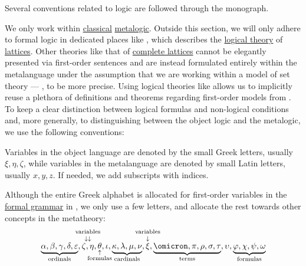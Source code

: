 \begin{remark}\label{rem:mathematical_logic_conventions}
  Several conventions related to logic are followed through the monograph.

  We only work within \hyperref[def:classical_logic]{classical} \hyperref[con:metalogic]{metalogic}. Outside this section, we will only adhere to formal logic in dedicated places like , which describes the \hyperref[def:logical_theory]{logical theory} of \hyperref[def:lattice]{lattices}. Other theories like that of \hyperref[def:complete_lattice]{complete lattices} cannot be elegantly presented via first-order sentences and are instead formulated entirely within the metalanguage under the assumption that we are working within a model of set theory --- \hyperref[def:axiom_of_universes]{}, to be more precise. Using logical theories like  allows us to implicitly reuse a plethora of definitions and theorems regarding first-order models from . To keep a clear distinction between logical formulas and non-logical conditions and, more generally, to distinguishing between the object logic and the metalogic, we use the following conventions:

  \begin{thmenum}
     Variables in the object language are denoted by the small Greek letters, usually \( \xi, \eta, \zeta \), while variables in the metalanguage are denoted by small Latin letters, usually \( x, y, z \). If needed, we add subscripts with indices.

     Although the entire Greek alphabet is allocated for first-order variables in the \hyperref[def:formal_grammar]{formal grammar} in , we only use a few letters, and allocate the rest towards other concepts in the metatheory:
    \begin{equation*}
      \underbrace{\alpha, \beta, \gamma, \delta, \varepsilon}_{\T{ordinals}},
      \overset{ \mathclap{ \substack{ \T{variables} \mathstrut \\ \mathstrut \downarrow \downarrow } } }{\zeta, \eta},
      \underset{ \mathclap{ \substack{ \uparrow \\ \T{formulas} } } }{\theta},
      \iota,
      \underbrace{\kappa, \lambda, \mu, \nu}_{\T{cardinals}},
      \overset{ \mathclap{ \substack{ \T{variables} \mathstrut \\ \mathstrut \downarrow } } }{\xi},
      \underbrace{\omicron, \pi, \rho, \sigma, \tau}_{\T{terms}},
      \upsilon,
      \underbrace{\varphi, \chi, \psi, \omega}_{\T{formulas}}
    \end{equation*}


\end{thmenum}
\end{remark}
